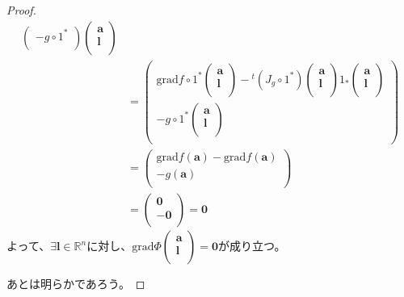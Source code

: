 \documentclass[dvipdfmx]{jsarticle}
\begin{document}
\begin{proof}
\begin{align*}
\begin{pmatrix}
 - g \circ 1^{*} \\
\end{pmatrix}\begin{pmatrix}
\mathbf{a} \\
\mathbf{l} \\
\end{pmatrix}\\
&= \begin{pmatrix}
\mathrm{grad}f \circ 1^{*}\begin{pmatrix}
\mathbf{a} \\
\mathbf{l} \\
\end{pmatrix} -{}^t \left( J_{g} \circ 1^{*} \right)\begin{pmatrix}
\mathbf{a} \\
\mathbf{l} \\
\end{pmatrix}1_{*}\begin{pmatrix}
\mathbf{a} \\
\mathbf{l} \\
\end{pmatrix} \\
 - g \circ 1^{*}\begin{pmatrix}
\mathbf{a} \\
\mathbf{l} \\
\end{pmatrix} \\
\end{pmatrix}\\
&= \begin{pmatrix}
\mathrm{grad}f\left( \mathbf{a} \right) - \mathrm{grad}f\left( \mathbf{a} \right) \\
 - g\left( \mathbf{a} \right) \\
\end{pmatrix}\\
&= \begin{pmatrix}
\mathbf{0} \\
\mathbf{- 0} \\
\end{pmatrix} = \mathbf{0}
\end{align*}
よって、$\exists\mathbf{l} \in \mathbb{R}^{n}$に対し、$\mathrm{grad}\varPhi\begin{pmatrix}
\mathbf{a} \\
\mathbf{l} \\
\end{pmatrix} = \mathbf{0}$が成り立つ。\par
あとは明らかであろう。
\end{proof}
\end{document}
